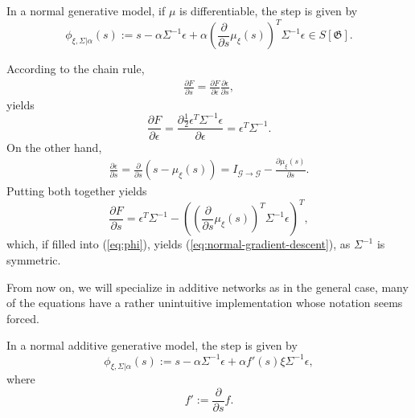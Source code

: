 \documentclass[a4paper,11pt]{report}
\begin{document}
\begin{Lem}\label{lem:grad-desc-normal}
In a normal generative model, if $\mu$ is differentiable, the step is given by
\begin{equation}\label{eq:normal-gradient-descent}
\phi_{\xi,\Sigma|\alpha}(s):=s-
\alpha\Sigma^{-1}\epsilon
+
\alpha\left(\frac{\partial}{\partial s}\mu_{\xi}(s)\right)^T\Sigma^{-1}\epsilon
\in 
S[\mathfrak{G}].
\end{equation}
\end{Lem}

\begin{Bew}
According to the chain rule,
\begin{align*}
\frac{\partial F}{\partial s}=\frac{\partial F}{\partial\epsilon}\frac{\partial\epsilon}{\partial s},
\end{align*}
 yields
\[\frac{\partial F}{\partial\epsilon}=\frac{\partial\frac12\epsilon^T\Sigma^{-1}\epsilon}{\partial\epsilon}=\epsilon^T\Sigma^{-1}.\]
On the other hand, 
\begin{align*}
\frac{\partial\epsilon}{\partial s}=
\frac{\partial}{\partial s}(s-\mu_{\xi}(s))=
I_{\mathcal{G}\to\mathcal{G}}-\frac{\partial\mu_{\xi}(s)}{\partial s}.
\end{align*}
Putting both together yields
\[
\frac{\partial F}{\partial s}=
\epsilon^T\Sigma^{-1}
-
\left(\left(\frac{\partial}{\partial s}\mu_{\xi}(s)\right)^T\Sigma^{-1}\epsilon\right)^T,
\]
which, if filled into (\ref{eq:phi}), yields (\ref{eq:normal-gradient-descent}), as $\Sigma^{-1}$ is symmetric.
\end{Bew}

\begin{Par}
From now on, we will specialize in additive networks as in the general case, many of the equations have a rather unintuitive implementation whose notation seems forced.
\end{Par}

\begin{Cor}\label{grad-desc-add}
In a normal additive generative model, the step is given by
\begin{equation}\label{eq:grad-desc-add}
\phi_{\xi,\Sigma|\alpha}(s):=s-\alpha\Sigma^{-1}\epsilon
+\alpha
f'(s)\xi\Sigma^{-1}\epsilon,
\end{equation}
where
\begin{equation}
f':=\frac{\partial}{\partial s}f.
\end{equation}
\end{Cor}
\end{document}
